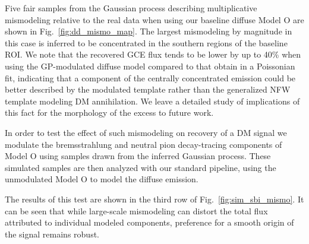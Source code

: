 \documentclass[prd,aps,10pt,nofootinbib,twocolumn,superscriptaddress,preprintnumbers,balancelastpage,longbibliography]{revtex4-1}
\begin{document}
Five fair samples from the Gaussian process describing multiplicative mismodeling relative to the real \Fermi data when using our baseline diffuse Model O are shown in Fig.~\ref{fig:dd_mismo_map}. The largest mismodeling by magnitude in this case is inferred to be concentrated in the southern regions of the baseline ROI. We note that the recovered GCE flux tends to be lower by up to 40\% when using the GP-modulated diffuse model compared to that obtain in a Poissonian fit, indicating that a component of the centrally concentrated emission could be better described by the modulated template rather than the generalized NFW template modeling DM annihilation. We leave a detailed study of implications of this fact for the morphology of the excess to future work.

In order to test the effect of such mismodeling on recovery of a DM signal we modulate the bremsstrahlung and neutral pion decay-tracing components of Model O using samples drawn from the inferred Gaussian process. These simulated samples are then analyzed with our standard pipeline, using the unmodulated Model O to model the diffuse emission.

The results of this test are shown in the third row of Fig.~\ref{fig:sim_sbi_mismo}. It can be seen that while large-scale mismodeling can distort the total flux attributed to individual modeled components, preference for a smooth origin of the signal remains robust. \\

\end{document}
